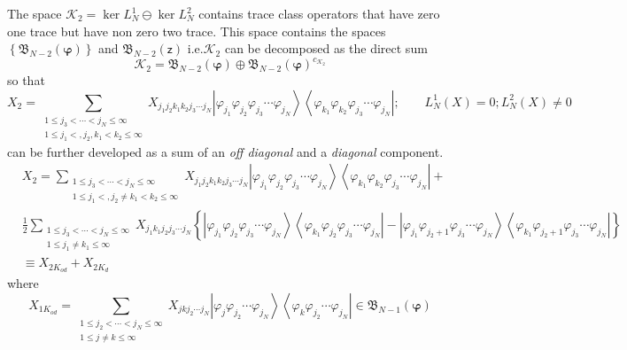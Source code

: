 \documentclass[aps,preprint]{revtex4}%
\begin{document}
The space $\mathcal{K}_{2}=\ker L_{N}^{1}\ominus\ker L_{N}^{2}$ contains trace
class operators that have zero one trace but have non zero two trace. This
space contains the spaces $\left\{  \mathfrak{B}_{N-2}\left(  \mathbf{\varphi
}\right)  \right\}  $ and $\mathfrak{B}_{N-2}\left(  \mathsf{z}\right)  $
i.e.$\mathcal{K}_{2}$ can be decomposed as the direct sum
\begin{equation}
\mathcal{K}_{2}=\mathfrak{B}_{N-2}\left(  \mathbf{\varphi}\right)
\oplus\mathfrak{B}_{N-2}\left(  \mathbf{\varphi}\right)  ^{c_{\mathcal{K}_{2}%
}}%
\end{equation}
so that
\begin{equation}
X_{2}=\sum_{\substack{1\leq j_{3}<\cdots<j_{N}\leq\infty\\1\leq j_{1}%
<,j_{2},k_{1}<k_{2}\leq\infty}}X_{j_{1}j_{2}k_{1}k_{2}j_{3}\cdots j_{N}%
}\left\vert \varphi_{j_{1}}\varphi_{j_{2}}\varphi_{j_{3}}\cdots\varphi_{j_{N}%
}\right\rangle \left\langle \varphi_{k_{1}}\varphi_{k_{2}}\varphi_{j_{3}%
}\cdots\varphi_{j_{N}}\right\vert ;\qquad L_{N}^{1}\left(  X\right)
=0;L_{N}^{2}\left(  X\right)  \neq0
\end{equation}
can be further developed as a sum of an \textit{off diagonal }and a
\textit{diagonal }component.\textit{ }
\begin{align}
&  X_{2}=\sum_{\substack{1\leq j_{3}<\cdots<j_{N}\leq\infty\\1\leq
j_{1}<,j_{2}\neq k_{1}<k_{2}\leq\infty}}X_{j_{1}j_{2}k_{1}k_{2}j_{3}\cdots
j_{N}}\left\vert \varphi_{j_{1}}\varphi_{j_{2}}\varphi_{j_{3}}\cdots
\varphi_{j_{N}}\right\rangle \left\langle \varphi_{k_{1}}\varphi_{k_{2}%
}\varphi_{j_{3}}\cdots\varphi_{j_{N}}\right\vert +\\
&  \frac{1}{2}\sum_{\substack{1\leq j_{3}<\cdots<j_{N}\leq\infty\\1\leq
j_{1}\neq k_{1}\leq\infty}}X_{j_{1}k_{1}j_{2}j_{3}\cdots j_{N}}\left\{
\left\vert \varphi_{j_{1}}\varphi_{j_{2}}\varphi_{j_{3}}\cdots\varphi_{j_{N}%
}\right\rangle \left\langle \varphi_{k_{1}}\varphi_{j_{2}}\varphi_{j_{3}%
}\cdots\varphi_{j_{N}}\right\vert -\left\vert \varphi_{j_{1}}\varphi_{j_{2}%
+1}\varphi_{j_{3}}\cdots\varphi_{j_{N}}\right\rangle \left\langle
\varphi_{k_{1}}\varphi_{j_{2}+1}\varphi_{j_{3}}\cdots\varphi_{j_{N}%
}\right\vert \right\} \\
&  \equiv X_{2K_{od}}+X_{2K_{d}}%
\end{align}
where
\begin{equation}
X_{1K_{od}}=\sum_{\substack{1\leq j_{2}<\cdots<j_{N}\leq\infty\\1\leq j\neq
k\leq\infty}}X_{jkj_{2}\cdots j_{N}}\left\vert \varphi_{j}\varphi_{j_{2}%
}\cdots\varphi_{j_{N}}\right\rangle \left\langle \varphi_{k}\varphi_{j_{2}%
}\cdots\varphi_{j_{N}}\right\vert \in\mathfrak{B}_{N-1}\left(  \mathbf{\varphi
}\right)
\end{equation}
\end{document}

